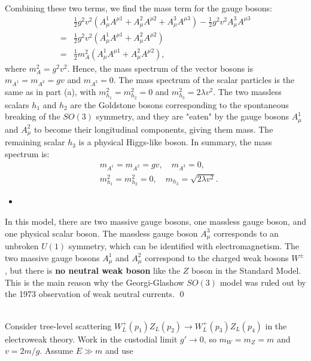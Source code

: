 Combining these two terms, we find the mass term for the gauge bosons:
\begin{align}
    &\frac{1}{2} g^2 v^2 (A_\mu^1 A^{\mu 1} + A_\mu^2 A^{\mu 2} + A_\mu^3 A^{\mu 3}) - \frac{1}{2} g^2 v^2 A_\mu^3 A^{\mu 3}\\
    =& \frac{1}{2} g^2 v^2 (A_\mu^1 A^{\mu 1} + A_\mu^2 A^{\mu 2})\\
    =& \frac{1}{2} m_A^2 (A_\mu^1 A^{\mu 1} + A_\mu^2 A^{\mu 2}),
\end{align}
where $m_A^2 = g^2 v^2$. Hence, the mass spectrum of the vector bosons is $m_{A^1} = m_{A^2} = gv$ and $m_{A^3} = 0$. The mass spectrum of the scalar particles is the same as in part (a), with $m_{h_1}^2 = m_{h_2}^2 =0$ and $m_{h_3}^2 = 2\lambda v^2$. The two massless scalars $h_1$ and $h_2$ are the Goldstone bosons corresponding to the spontaneous breaking of the $SO(3)$ symmetry, and they are "eaten" by the gauge bosons $A_\mu^1$ and $A_\mu^2$ to become their longitudinal components, giving them mass. The remaining scalar $h_3$ is a physical Higgs-like boson. In summary, the mass spectrum is:
\begin{align}
    &m_{A^1} = m_{A^2} = gv, \quad m_{A^3} = 0,\\
    &m_{h_1}^2 = m_{h_2}^2 =0, \quad m_{h_3} = \sqrt{2\lambda v^2}.
\end{align}

\begin{itemize}
    \item [(c)]
\end{itemize}
In this model, there are two massive gauge bosons, one massless gauge boson, and one physical scalar boson. The massless gauge boson $A_\mu^3$ corresponds to an unbroken $U(1)$ symmetry, which can be identified with electromagnetism. The two massive gauge bosons $A_\mu^1$ and $A_\mu^2$ correspond to the charged weak bosons $W^\pm$, but there is \textbf{no neutral weak boson} like the $Z$ boson in the Standard Model. This is the main reason why the Georgi-Glashow $SO(3)$ model was ruled out by the 1973 observation of weak neutral currents. \qed

\clearpage
{}\\
Consider tree-level scattering $W^+_L(p_1) Z_L(p_2) \to W^+_L(p_3) Z_L(p_4)$ in the electroweak theory. Work in the custodial limit $g'\to 0$, so $m_W=m_Z=m$ and $v=2m/g$. Assume $E\gg m$ and use 

